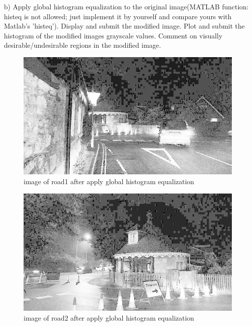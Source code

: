 \documentclass[
	12pt, %
]{fphw}
\begin{document}
\begin{problem}
	b)  Apply global histogram equalization to the original image(MATLAB function: histeq is not allowed; just
	implement it by yourself and compare yours with Matlab’s ’histeq’). Display and submit the modified image. Plot
	and submit the histogram of the modified images grayscale values. Comment on visually desirable/undesirable
	regions in the modified image.
\end{problem}
\begin{figure}[H]
 
	\centering
	\includegraphics[width=1\columnwidth]{T2/result/I1_myglobal.jpg} 
	\caption{image of road1 after apply global histogram equalization}
	\label{fig10}
\end{figure}
\begin{figure}[H]
 
	\centering
	\includegraphics[width=1\columnwidth]{T2/result/I2_myglobal.jpg} 
	\caption{image of road2 after apply global histogram equalization}
	\label{fig11}
\end{figure}
\end{document}
